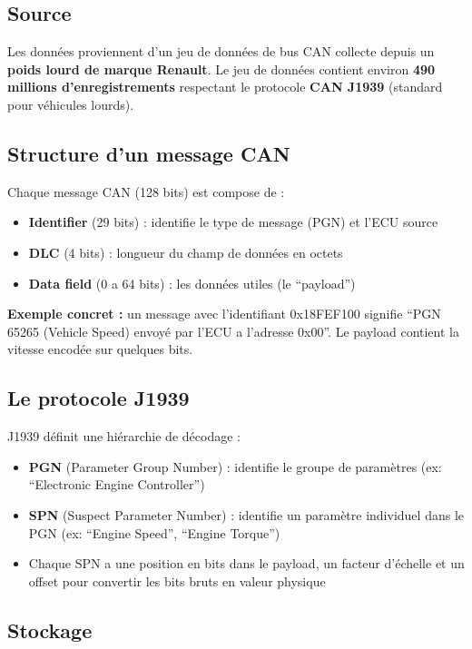 \documentclass[12pt,a4paper]{article}
\begin{document}
\subsection{Source}

Les données proviennent d'un jeu de données de bus CAN collecte depuis un \textbf{poids lourd de marque Renault}. Le jeu de données contient environ \textbf{490 millions d'enregistrements} respectant le protocole \textbf{CAN J1939} (standard pour véhicules lourds).

\subsection{Structure d'un message CAN}

Chaque message CAN (128 bits) est compose de :
\begin{itemize}[noitemsep]
    \item \textbf{Identifier} (29 bits) : identifie le type de message (PGN) et l'ECU source
    \item \textbf{DLC} (4 bits) : longueur du champ de données en octets
    \item \textbf{Data field} (0 a 64 bits) : les données utiles (le ``payload'')
\end{itemize}

\textbf{Exemple concret :} un message avec l'identifiant 0x18FEF100 signifie ``PGN 65265 (Vehicle Speed) envoyé par l'ECU a l'adresse 0x00''. Le payload contient la vitesse encodée sur quelques bits.

\subsection{Le protocole J1939}

J1939 définit une hiérarchie de décodage :
\begin{itemize}[noitemsep]
    \item \textbf{PGN} (Parameter Group Number) : identifie le groupe de paramètres (ex: ``Electronic Engine Controller'')
    \item \textbf{SPN} (Suspect Parameter Number) : identifie un paramètre individuel dans le PGN (ex: ``Engine Speed'', ``Engine Torque'')
    \item Chaque SPN a une position en bits dans le payload, un facteur d'échelle et un offset pour convertir les bits bruts en valeur physique
\end{itemize}

\subsection{Stockage}
\end{document}
